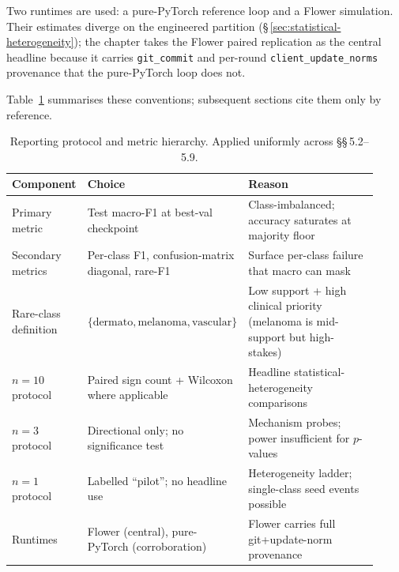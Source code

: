 \documentclass[11pt,a4paper]{report}
\begin{document}
Two runtimes are used: a pure-PyTorch reference loop and a Flower
simulation. Their estimates diverge on the engineered partition
(\S\,\ref{sec:statistical-heterogeneity}); the chapter takes the Flower
paired replication as the central headline because it carries
\texttt{git\_commit} and per-round \texttt{client\_update\_norms} provenance
that the pure-PyTorch loop does not.

Table~\ref{tab:reporting-protocol} summarises these conventions; subsequent
sections cite them only by reference.



\begin{table}[h]
\centering
\small
\caption{Reporting protocol and metric hierarchy. Applied uniformly across
\S\S\,5.2--5.9.}
\label{tab:reporting-protocol}
\begin{tabular}{p{0.20\linewidth} p{0.32\linewidth} p{0.40\linewidth}}
\hline
Component               & Choice                                       & Reason \\
\hline
Primary metric          & Test macro-F1 at best-val checkpoint         & Class-imbalanced; accuracy saturates at majority floor \\
Secondary metrics       & Per-class F1, confusion-matrix diagonal, rare-F1 & Surface per-class failure that macro can mask \\
Rare-class definition   & $\{\text{dermato}, \text{melanoma}, \text{vascular}\}$ & Low support + high clinical priority (melanoma is mid-support but high-stakes) \\
$n = 10$ protocol       & Paired sign count + Wilcoxon where applicable & Headline statistical-heterogeneity comparisons \\
$n = 3$ protocol        & Directional only; no significance test       & Mechanism probes; power insufficient for $p$-values \\
$n = 1$ protocol        & Labelled ``pilot''; no headline use          & Heterogeneity ladder; single-class seed events possible \\
Runtimes                & Flower (central), pure-PyTorch (corroboration) & Flower carries full git+update-norm provenance \\
\hline
\end{tabular}
\end{table}
\end{document}
